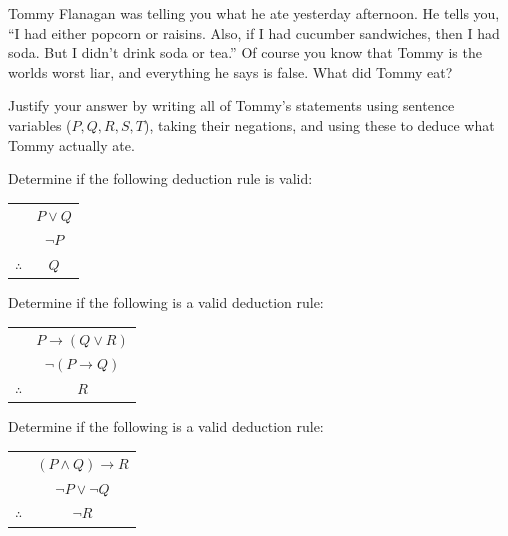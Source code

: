 \documentclass[10pt,]{book}
\theoremstyle{plain}
\theoremstyle{definition}
\theoremstyle{definition}
\theoremstyle{definition}
\theoremstyle{definition}
\numberwithin{equation}{chapter}
\newcommand{\hrulethin}  {\noalign{\hrule height 0.04em}}
\def\imp{\rightarrow}
\begin{document}
\begin{divisionexercise}{9}\hypertarget{exercise-228}{}
\hypertarget{p-1883}{}%
Tommy Flanagan was telling you what he ate yesterday afternoon. He tells you, ``I had either popcorn or raisins. Also, if I had cucumber sandwiches, then I had soda. But I didn't drink soda or tea.'' Of course you know that Tommy is the worlds worst liar, and everything he says is false. What did Tommy eat?%
\par
\hypertarget{p-1884}{}%
Justify your answer by writing all of Tommy's statements using sentence variables (\(P, Q, R, S, T\)), taking their negations, and using these to deduce what Tommy actually ate.%
\end{divisionexercise}%
\begin{divisionexercise}{10}\hypertarget{exercise-229}{}
\hypertarget{p-1885}{}%
Determine if the following deduction rule is valid:%
\begin{sidebyside}{1}{0}{0}{0}
\begin{sbspanel}{1}
{\centering%
\begin{tabular}{cc}
&\(P \vee Q\)\tabularnewline[0pt]
&\(\neg P\)\tabularnewline\hrulethin
\(\therefore\)&\(Q\)
\end{tabular}
\par}
\end{sbspanel}
\end{sidebyside}
\end{divisionexercise}%
\begin{divisionexercise}{11}\hypertarget{exercise-230}{}
\hypertarget{p-1887}{}%
Determine if the following is a valid deduction rule:%
\begin{sidebyside}{1}{0}{0}{0}
\begin{sbspanel}{1}
{\centering%
\begin{tabular}{cc}
&\(P \imp (Q \vee R)\)\tabularnewline[0pt]
&\(\neg(P \imp Q)\)\tabularnewline\hrulethin
\(\therefore\)&\(R\)
\end{tabular}
\par}
\end{sbspanel}
\end{sidebyside}
\end{divisionexercise}%
\begin{divisionexercise}{12}\hypertarget{exercise-231}{}
\hypertarget{p-1888}{}%
Determine if the following is a valid deduction rule:%
\begin{sidebyside}{1}{0}{0}{0}
\begin{sbspanel}{1}
{\centering%
\begin{tabular}{cc}
&\((P \wedge Q) \imp R\)\tabularnewline[0pt]
&\(\neg P \vee \neg Q\)\tabularnewline\hrulethin
\(\therefore\)&\(\neg R\)
\end{tabular}
\par}
\end{sbspanel}
\end{sidebyside}
\end{divisionexercise}%
\end{document}
